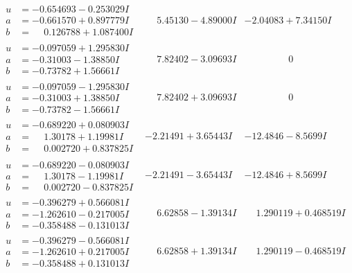 \documentclass[1p]{elsarticle_modified}
\theoremstyle{definition}
\begin{document}
$$\begin{array}{c|c|c}
\begin{aligned}
u &= -0.654693 - 0.253029 I \\
a &= -0.661570 + 0.897779 I \\
b &= \phantom{-}0.126788 + 1.087400 I\end{aligned}
 & \phantom{-}5.45130 - 4.89000 I & -2.04083 + 7.34150 I \\ \hline\begin{aligned}
u &= -0.097059 + 1.295830 I \\
a &= -0.31003 - 1.38850 I \\
b &= -0.73782 + 1.56661 I\end{aligned}
 & \phantom{-}7.82402 - 3.09693 I & \phantom{-0.000000 } 0 \\ \hline\begin{aligned}
u &= -0.097059 - 1.295830 I \\
a &= -0.31003 + 1.38850 I \\
b &= -0.73782 - 1.56661 I\end{aligned}
 & \phantom{-}7.82402 + 3.09693 I & \phantom{-0.000000 } 0 \\ \hline\begin{aligned}
u &= -0.689220 + 0.080903 I \\
a &= \phantom{-}1.30178 + 1.19981 I \\
b &= \phantom{-}0.002720 + 0.837825 I\end{aligned}
 & -2.21491 + 3.65443 I & -12.4846 - 8.5699 I \\ \hline\begin{aligned}
u &= -0.689220 - 0.080903 I \\
a &= \phantom{-}1.30178 - 1.19981 I \\
b &= \phantom{-}0.002720 - 0.837825 I\end{aligned}
 & -2.21491 - 3.65443 I & -12.4846 + 8.5699 I \\ \hline\begin{aligned}
u &= -0.396279 + 0.566081 I \\
a &= -1.262610 - 0.217005 I \\
b &= -0.358488 - 0.131013 I\end{aligned}
 & \phantom{-}6.62858 - 1.39134 I & \phantom{-}1.290119 + 0.468519 I \\ \hline\begin{aligned}
u &= -0.396279 - 0.566081 I \\
a &= -1.262610 + 0.217005 I \\
b &= -0.358488 + 0.131013 I\end{aligned}
 & \phantom{-}6.62858 + 1.39134 I & \phantom{-}1.290119 - 0.468519 I \\ \hline\begin{aligned}

\end{aligned}
\end{array}$$
\end{document}
